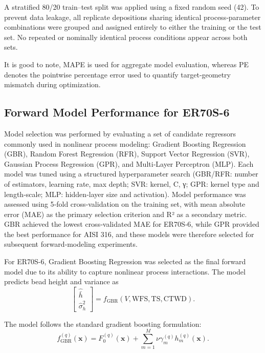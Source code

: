 \documentclass[11pt]{article}
\begin{document}
A stratified 80/20 train–test split was applied using a fixed random seed (42). To prevent data leakage, all replicate depositions sharing identical process‑parameter combinations were grouped and assigned entirely to either the training or the test set. No repeated or nominally identical process conditions appear across both sets.

It is good to note, MAPE is used for aggregate model evaluation, whereas PE denotes the pointwise percentage error used to quantify target-geometry mismatch during optimization.

\subsection{Forward Model Performance for ER70S-6}

Model selection was performed by evaluating a set of candidate regressors commonly used in nonlinear process modeling: Gradient Boosting Regression (GBR), Random Forest Regression (RFR), Support Vector Regression (SVR), Gaussian Process Regression (GPR), and Multi‑Layer Perceptron (MLP). Each model was tuned using a structured hyperparameter search (GBR/RFR: number of estimators, learning rate, max depth; SVR: kernel, C, γ; GPR: kernel type and length‑scale; MLP: hidden‑layer size and activation). Model performance was assessed using 5‑fold cross‑validation on the training set, with mean absolute error (MAE) as the primary selection criterion and R² as a secondary metric. GBR achieved the lowest cross‑validated MAE for ER70S‑6, while GPR provided the best performance for AISI 316, and these models were therefore selected for subsequent forward‑modeling experiments.

For ER70S-6, Gradient Boosting Regression was selected as the final forward model due to its ability to capture nonlinear process interactions. The model predicts bead height and variance as
\begin{equation}
\begin{bmatrix}
\hat{\bar{h}} \\
\hat{\sigma}_h^2
\end{bmatrix}
=
f_{\mathrm{GBR}}(V,\mathrm{WFS},\mathrm{TS},\mathrm{CTWD}).
\end{equation}

The model follows the standard gradient boosting formulation:
\begin{equation}
f_{\mathrm{GBR}}^{(q)}(\mathbf{x}) =
F_0^{(q)}(\mathbf{x}) +
\sum_{m=1}^{M}
\nu \gamma_m^{(q)} h_m^{(q)}(\mathbf{x}).
\end{equation}
\end{document}
